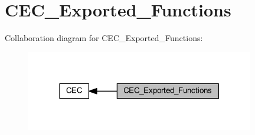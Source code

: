 \hypertarget{group___c_e_c___exported___functions}{}\section{C\+E\+C\+\_\+\+Exported\+\_\+\+Functions}
\label{group___c_e_c___exported___functions}
Collaboration diagram for C\+E\+C\+\_\+\+Exported\+\_\+\+Functions\+:
\nopagebreak
\begin{figure}[H]
\begin{center}
\leavevmode
\includegraphics[width=282pt]{group___c_e_c___exported___functions}
\end{center}
\end{figure}
